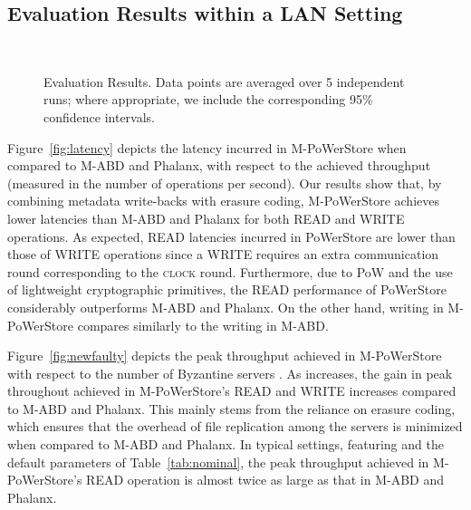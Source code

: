 \documentclass[10pt,conference,compsocconf]{IEEEtran}
\newcommand{\protocol}{PoWerStore}
\newcommand{\mprotocol}{M-PoWerStore}
\begin{document}
\subsection{Evaluation Results within a LAN Setting}\label{subsec:lan}

\begin{figure*}[tb]
  \centering
           \hspace{.01in}
     \\
     \hspace{.01in}
     \caption{Evaluation Results. Data points are averaged over 5 independent runs; where appropriate, we include the corresponding 95\% confidence intervals.}
    \label{fig:results}
\end{figure*}

Figure~\ref{fig:latency} depicts the latency incurred in \mprotocol{} when compared to M-ABD and Phalanx, with respect to the achieved throughput (measured in the number of operations per second).
Our results show that, by combining metadata write-backs with erasure coding, \mprotocol{} achieves lower latencies than M-ABD and Phalanx for both \textsc{READ} and \textsc{WRITE} operations.
As expected, \textsc{READ} latencies incurred in \protocol{} are lower than those of \textsc{WRITE} operations since a \textsc{WRITE} requires an extra communication round corresponding to the \textsc{clock} round. Furthermore, due to PoW and the use of lightweight cryptographic primitives, the \textsc{READ} performance of \protocol{} considerably outperforms M-ABD and Phalanx. On the other hand, writing in \mprotocol{} compares similarly to the writing in M-ABD.

Figure~\ref{fig:newfaulty} depicts the peak throughput achieved in \mprotocol{} with respect to the number of Byzantine servers .
As  increases, the gain in peak throughout achieved in \mprotocol's \textsc{READ} and \textsc{WRITE} increases compared to M-ABD and Phalanx. This mainly stems from the reliance on erasure coding, which ensures that
the overhead of file replication among the servers is minimized when compared to M-ABD and Phalanx. In typical settings, featuring  and the default parameters of Table~\ref{tab:nominal}, the peak throughput achieved in \mprotocol's \textsc{READ} operation is almost twice as large as that in M-ABD and Phalanx.
\end{document}

